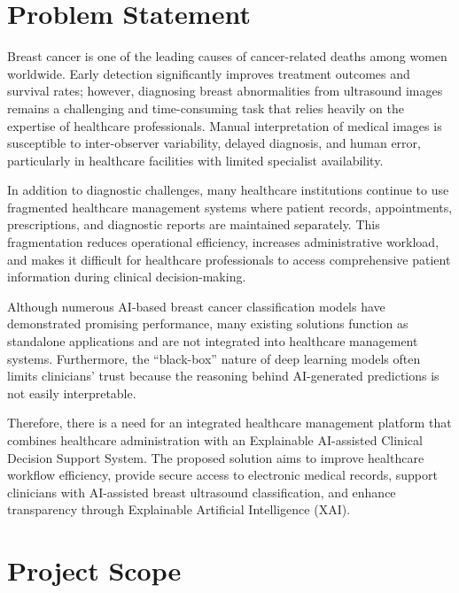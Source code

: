 \documentclass[12pt,a4paper]{report}
\begin{document}
\section{Problem Statement}

Breast cancer is one of the leading causes of cancer-related deaths among women worldwide. Early detection significantly improves treatment outcomes and survival rates; however, diagnosing breast abnormalities from ultrasound images remains a challenging and time-consuming task that relies heavily on the expertise of healthcare professionals. Manual interpretation of medical images is susceptible to inter-observer variability, delayed diagnosis, and human error, particularly in healthcare facilities with limited specialist availability.

In addition to diagnostic challenges, many healthcare institutions continue to use fragmented healthcare management systems where patient records, appointments, prescriptions, and diagnostic reports are maintained separately. This fragmentation reduces operational efficiency, increases administrative workload, and makes it difficult for healthcare professionals to access comprehensive patient information during clinical decision-making.

Although numerous AI-based breast cancer classification models have demonstrated promising performance, many existing solutions function as standalone applications and are not integrated into healthcare management systems. Furthermore, the ``black-box'' nature of deep learning models often limits clinicians' trust because the reasoning behind AI-generated predictions is not easily interpretable.

Therefore, there is a need for an integrated healthcare management platform that combines healthcare administration with an Explainable AI-assisted Clinical Decision Support System. The proposed solution aims to improve healthcare workflow efficiency, provide secure access to electronic medical records, support clinicians with AI-assisted breast ultrasound classification, and enhance transparency through Explainable Artificial Intelligence (XAI).

\section{Project Scope}
\end{document}
